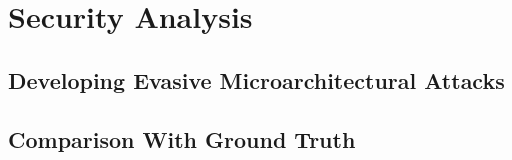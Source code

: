 \section{Security Analysis}\label{sec:whac}\label{sec:varSpec}

\subsection{Developing Evasive Microarchitectural Attacks }

\subsection{Comparison With Ground Truth}